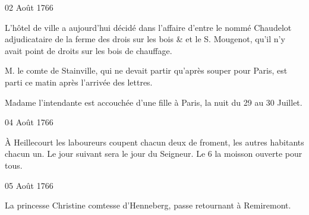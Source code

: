                     \begin{diary}{02 Août 1766}{}
                        
                        
                           L'hôtel de ville a aujourd'hui décidé dans l'affaire
                           d'entre le nommé Chaudelot adjudicataire de la ferme
                           des drois sur les bois & et le S.
                              Mougenot, qu'il
                           n'y avait point de droits sur les bois de chauffage. \bigskip
        
        
                        
                           M. le comte de Stainville, qui ne
                           devait partir
                           qu'après souper pour Paris, est
                           parti ce matin
                           après l'arrivée des lettres. \bigskip
        
        
                        
                           Madame l'intendante est accouchée d'une fille
                           à Paris, la nuit du 29 au 30 Juillet. \bigskip
        
        
                     \end{diary}

                     \begin{diary}{04 Août 1766}{}
                        
                         À Heillecourt les laboureurs coupent chacun
                           deux de froment, les autres habitants
                           chacun un. Le jour suivant sera le jour
                           du Seigneur. Le 6 la moisson ouverte
                           pour tous. \bigskip
        
        
                     \end{diary}

                     \begin{diary}{05 Août 1766}{}
                        
                        
                           La princesse Christine comtesse d'Henneberg, passe retournant
                           à Remiremont. \bigskip
        
        
                     \end{diary}

